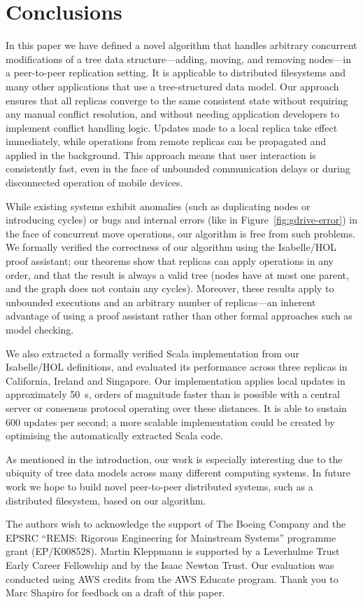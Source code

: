 \documentclass[sigplan,anonymous]{acmart}
\begin{document}
\section{Conclusions}

In this paper we have defined a novel algorithm that handles arbitrary concurrent modifications of a tree data structure---adding, moving, and removing nodes---in a peer-to-peer replication setting.
It is applicable to distributed filesystems and many other applications that use a tree-structured data model.
Our approach ensures that all replicas converge to the same consistent state without requiring any manual conflict resolution, and without needing application developers to implement conflict handling logic.
Updates made to a local replica take effect immediately, while operations from remote replicas can be propagated and applied in the background.
This approach means that user interaction is consistently fast, even in the face of unbounded communication delays or during disconnected operation of mobile devices.

While existing systems exhibit anomalies (such as duplicating nodes or introducing cycles) or bugs and internal errors (like in Figure~\ref{fig:gdrive-error}) in the face of concurrent move operations, our algorithm is free from such problems.
We formally verified the correctness of our algorithm using the Isabelle/HOL proof assistant; our theorems show that replicas can apply operations in any order, and that the result is always a valid tree (nodes have at most one parent, and the graph does not contain any cycles).
Moreover, these results apply to unbounded executions and an arbitrary number of replicas---an inherent advantage of using a proof assistant rather than other formal approaches such as model checking.

We also extracted a formally verified Scala implementation from our Isabelle/HOL definitions, and evaluated its performance across three replicas in California, Ireland and Singapore.
Our implementation applies local updates in approximately 50~{\textmu}s, orders of magnitude faster than is possible with a central server or consensus protocol operating over these distances.
It is able to sustain 600 updates per second; a more scalable implementation could be created by optimising the automatically extracted Scala code.

As mentioned in the introduction, our work is especially interesting due to the ubiquity of tree data models across many different computing systems.
In future work we hope to build novel peer-to-peer distributed systems, such as a distributed filesystem, based on our algorithm.

\begin{acks}
The authors wish to acknowledge the support of The Boeing Company and the EPSRC ``REMS: Rigorous Engineering for Mainstream Systems'' programme grant (EP/K008528).
Martin Kleppmann is supported by a Leverhulme Trust Early Career Fellowship and by the Isaac Newton Trust.
Our evaluation was conducted using AWS credits from the AWS Educate program.
Thank you to Marc Shapiro for feedback on a draft of this paper.
\end{acks}


{}
\end{document}

